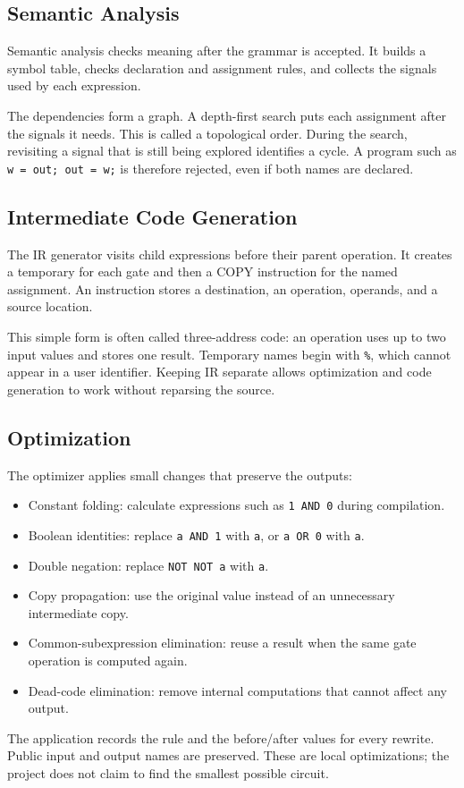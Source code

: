 \documentclass[conference]{IEEEtran}
\newcommand{\code}[1]{\texttt{#1}}
\begin{document}
\subsection{Semantic Analysis}
Semantic analysis checks meaning after the grammar is accepted. It builds a symbol table, checks declaration and assignment rules, and collects the signals used by each expression.

The dependencies form a graph. A depth-first search puts each assignment after the signals it needs. This is called a topological order. During the search, revisiting a signal that is still being explored identifies a cycle. A program such as \code{w = out; out = w;} is therefore rejected, even if both names are declared.

\subsection{Intermediate Code Generation}
The IR generator visits child expressions before their parent operation. It creates a temporary for each gate and then a COPY instruction for the named assignment. An instruction stores a destination, an operation, operands, and a source location.

This simple form is often called three-address code: an operation uses up to two input values and stores one result. Temporary names begin with \code{\%}, which cannot appear in a user identifier. Keeping IR separate allows optimization and code generation to work without reparsing the source.

\subsection{Optimization}
The optimizer applies small changes that preserve the outputs:
\begin{itemize}
\item Constant folding: calculate expressions such as \code{1 AND 0} during compilation.
\item Boolean identities: replace \code{a AND 1} with \code{a}, or \code{a OR 0} with \code{a}.
\item Double negation: replace \code{NOT NOT a} with \code{a}.
\item Copy propagation: use the original value instead of an unnecessary intermediate copy.
\item Common-subexpression elimination: reuse a result when the same gate operation is computed again.
\item Dead-code elimination: remove internal computations that cannot affect any output.
\end{itemize}
The application records the rule and the before/after values for every rewrite. Public input and output names are preserved. These are local optimizations; the project does not claim to find the smallest possible circuit.
\end{document}
